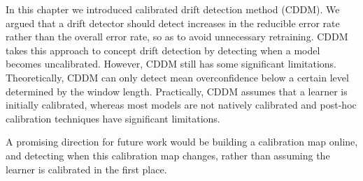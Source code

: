 In this chapter we introduced calibrated drift detection method (CDDM). We argued that a drift detector should detect increases in the reducible error rate rather than the overall error rate, so as to avoid unnecessary retraining. CDDM takes this approach to concept drift detection by detecting when a model becomes uncalibrated. However, CDDM still has some significant limitations. Theoretically, CDDM can only detect mean overconfidence below a certain level determined by the window length. Practically, CDDM assumes that a learner is initially calibrated, whereas most models are not natively calibrated and post-hoc calibration techniques have significant limitations.

A promising direction for future work would be building a calibration map online, and detecting when this calibration map changes, rather than assuming the learner is calibrated in the first place.